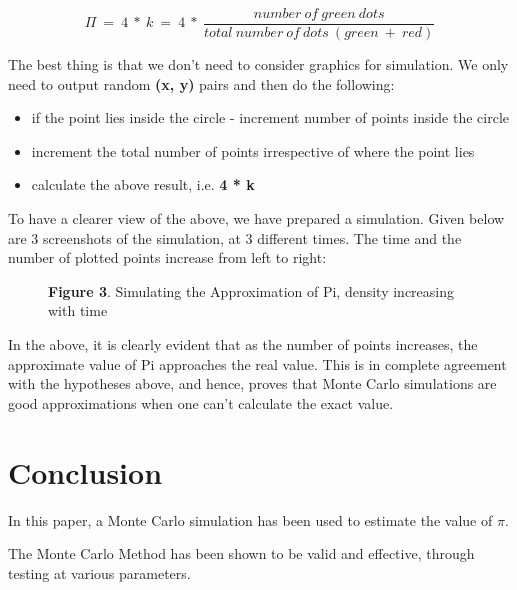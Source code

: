 \documentclass{resonance}
\begin{document}
	$$\Pi\ =\ 4\ *\ k\ =\ 4\ *\ \frac{number\ of\ green\ dots}{total\ number\ of\ dots\ (green\ +\ red)}$$
	
	The best thing is that we don’t need to consider graphics for simulation. We only need to output random \textbf{(x, y)} pairs and then do the following:
	
	\begin{itemize}
		\item if the point lies inside the circle - increment number of points inside the circle
		\item increment the total number of points irrespective of where the point lies
		\item calculate the above result, i.e. \textbf{4 * k}
	\end{itemize}
	
	To have a clearer view of the above, we have prepared a simulation. Given below are 3 screenshots of the simulation, at 3 different times. The time and the number of plotted points increase from left to right:
	
	\begin{figure}[h!]
		\hskip 0.7cm
		\vspace{20pt}
		\fbox{\texttt{[image: pi\_ss\_1]}}
		\fbox{\texttt{[image: pi\_ss\_2]}}
		\fbox{\texttt{[image: pi\_ss\_3]}}
		
		\vspace{-10pt}
		\hspace{30pt}\scriptsize{\textbf{Figure 3}. \normalfont Simulating the Approximation of Pi, density increasing with time}\\
	\end{figure}

	
	In the above, it is clearly evident that as the number of points increases, the approximate value of Pi approaches the real value. This is in complete agreement with the hypotheses above, and hence, proves that Monte Carlo simulations are good approximations when one can’t calculate the exact value.
		
	\section{Conclusion}
	In this paper, a Monte Carlo simulation has been used to estimate the value of $\pi$.
	
	The Monte Carlo Method has been shown to be valid and effective, through testing at various parameters.
	
\end{document}
